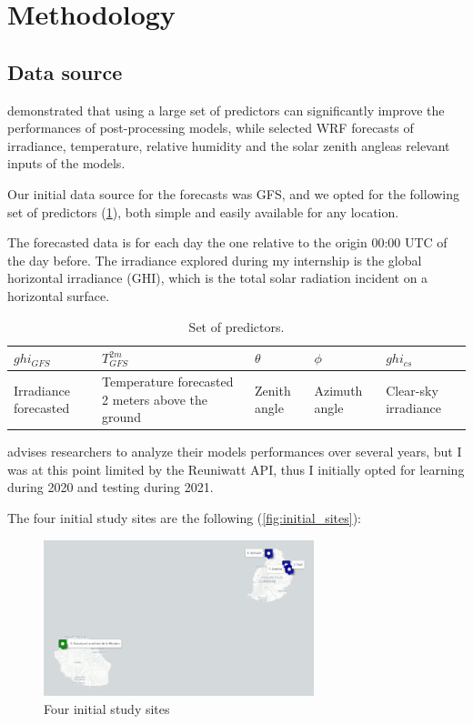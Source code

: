 \section{Methodology}
\label{sec:methodo}
\subsection{Data source}
\cite{verbois_statistical_2022} demonstrated that using a large set of predictors can significantly improve the performances of post-processing models, while \cite{suksamosorn_post-processing_2021}
selected WRF forecasts of irradiance, temperature, relative humidity and the solar zenith angleas relevant inputs of the models.

Our initial data source for the forecasts was GFS, and we opted for the following set of predictors (\ref{tab:set_pred}), both simple and easily available for any location.

The forecasted data is for each day the one relative to the origin 00:00 UTC of the day before. The irradiance explored during my internship is the global horizontal irradiance (GHI), which is
the total solar radiation incident on a horizontal surface.

\begin{table}[h]
    \centering
    \begin{tabularx}{\textwidth} { 
  | >{\centering\arraybackslash}X 
  | >{\centering\arraybackslash}X 
  | >{\centering\arraybackslash}X 
  | >{\centering\arraybackslash}X
  | >{\centering\arraybackslash}X 
  |}
 \hline
 $ghi_{GFS}$ & $T_{GFS}^{2m}$ & $\theta$ & $\phi$ & $ghi_{cs}$ \\
 \hline
 \scriptsize Irradiance forecasted  & \scriptsize Temperature forecasted 2 meters above the ground & \scriptsize Zenith angle & \scriptsize Azimuth angle & \scriptsize Clear-sky irradiance \\
\hline
\end{tabularx}
    \caption{Set of predictors.}
    \label{tab:set_pred}
\end{table}

\cite{verbois_statistical_2022} advises researchers to analyze their models performances over several years, but I was at this point limited by the Reuniwatt API, thus
I initially opted for learning during 2020 and testing during 2021.

The four initial study sites are the following (\autoref{fig:initial_sites}):
\begin{figure}[htb!]
    \centering
    \includegraphics[width=0.7\textwidth]{figures/initial_study_sites.png}
    \caption{Four initial study sites}
    \label{fig:initial_sites}
\end{figure}

